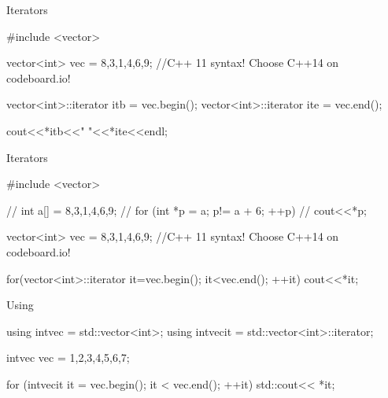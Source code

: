 \ifnum\conditionmacro=1 \documentclass[handout,usenames,dvipsnames]{beamer}\fi
\begin{document}
\begin{frame}[fragile]{Iterators}
\begin{TPCpp}
#include <vector>

vector<int> vec = {8,3,1,4,6,9}; 
//C++ 11 syntax! Choose C++14 on codeboard.io!

vector<int>::iterator itb = vec.begin();
vector<int>::iterator ite = vec.end();

cout<<*itb<<" "<<*ite<<endl;
\end{TPCpp}

\end{frame}


\begin{frame}[fragile]{Iterators}
\begin{TFCpp}
#include <vector>

// int a[] = {8,3,1,4,6,9};
// for (int *p = a; p!= a + 6; ++p)
//   cout<<*p;

vector<int> vec = {8,3,1,4,6,9}; 
//C++ 11 syntax! Choose C++14 on codeboard.io!

for(vector<int>::iterator it=vec.begin(); it<vec.end(); ++it)
	cout<<*it;
\end{TFCpp}
\end{frame}

\begin{frame}[fragile]{Using}
\begin{TFCpp}
using intvec = std::vector<int>;
using intvecit = std::vector<int>::iterator;

intvec vec = {1,2,3,4,5,6,7};

for (intvecit it = vec.begin(); it < vec.end(); ++it)
	std::cout<< *it;
\end{TFCpp}
\end{frame}

\end{document}
